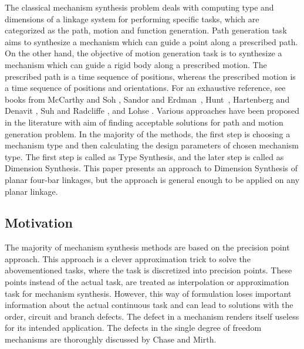 \documentclass[twocolumn,10pt]{asme2ej}
\begin{document}
The classical mechanism synthesis problem deals with computing type and dimensions of a linkage system for performing specific tasks, which are categorized as the path, motion and function generation.
Path generation task aims to synthesize a mechanism which can guide a point along a prescribed path.
On the other hand, the objective of motion generation task is to synthesize a mechanism which can guide a rigid body along a prescribed motion.
The prescribed path is a time sequence of positions, whereas the prescribed motion is a time sequence of positions and orientations.
For an exhaustive reference, see books from McCarthy and Soh \cite{sohmccarthy}, Sandor and Erdman~\cite{Sandor}, Hunt~\cite{Hunt78}, Hartenberg and Denavit \cite{Hartenberg},  Suh and Radcliffe \cite{Suh78}, and Lohse \cite{lohse2013}.
Various approaches have been proposed in the literature with aim of finding acceptable solutions for path and motion generation problem.
In the majority of the methods, the first step is choosing a mechanism type and then calculating the design parameters of chosen mechanism type.
The first step is called as Type Synthesis, and the later step is called as Dimension Synthesis.
This paper presents an approach to Dimension Synthesis of planar four-bar linkages, but the approach is general enough to be applied on any planar linkage.

\subsection{Motivation}
The majority of mechanism synthesis methods are based on the precision point approach.
This approach is a clever approximation trick to solve the abovementioned tasks, where the task is discretized into precision points.
These points instead of the actual task, are treated as interpolation or approximation task for mechanism synthesis.
However, this way of formulation loses important information about the actual continuous task and can lead to solutions with the order, circuit and branch defects.
The defect in a mechanism renders itself useless for its intended application.
The defects in the single degree of freedom mechanisms are thoroughly discussed by Chase and Mirth\cite{chasemirth}.
\end{document}
